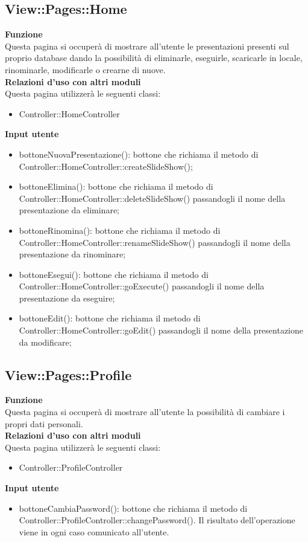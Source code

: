 {\subsection{View::Pages::Home}{
	\textbf{Funzione}\\
	\indent Questa pagina si occuperà di mostrare all'utente le presentazioni presenti sul proprio database dando la possibilità di eliminarle, eseguirle, scaricarle in locale, rinominarle, modificarle o crearne di nuove.\\
	\textbf{Relazioni d'uso con altri moduli}\\
	\indent Questa pagina utilizzerà le seguenti classi:
	\begin{itemize}
		\item Controller::HomeController
	\end{itemize}
	\textbf{Input utente}
	\begin{itemize}
		\item bottoneNuovaPresentazione(): bottone che richiama il metodo di Controller::HomeController::createSlideShow();
		\item bottoneElimina(): bottone che richiama il metodo di Controller::HomeController::deleteSlideShow() passandogli il nome della presentazione da eliminare;
		\item bottoneRinomina(): bottone che richiama il metodo di Controller::HomeController::renameSlideShow() passandogli il nome della presentazione da rinominare;
		\item bottoneEsegui(): bottone che richiama il metodo di Controller::HomeController::goExecute() passandogli il nome della presentazione da eseguire;
		\item bottoneEdit(): bottone che richiama il metodo di Controller::HomeController::goEdit() passandogli il nome della presentazione da modificare;
	\end{itemize}
	}
\subsection{View::Pages::Profile}{
	\textbf{Funzione}\\
	\indent Questa pagina si occuperà di mostrare all'utente la possibilità di cambiare i propri dati personali.\\
	\textbf{Relazioni d'uso con altri moduli}\\
	\indent Questa pagina utilizzerà le seguenti classi:
	\begin{itemize}
		\item Controller::ProfileController
	\end{itemize}
	\textbf{Input utente}
	\begin{itemize}
		\item bottoneCambiaPassword(): bottone che richiama il metodo di Controller::ProfileController::changePassword(). Il risultato dell'operazione viene in ogni caso comunicato all'utente.
	\end{itemize}
}
}
